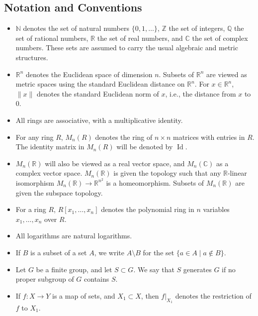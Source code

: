 \documentclass[11pt, a4paper]{article}
\begin{document}
\subsection*{Notation and Conventions}
\begin{itemize}
  \item $\mathbb{N}$ denotes the set of natural numbers $\{0, 1, \dots\}$, $\mathbb{Z}$ the set of integers, $\mathbb{Q}$ the set of rational numbers, $\mathbb{R}$ the set of real numbers, and $\mathbb{C}$ the set of complex numbers. These sets are assumed to carry the usual algebraic and metric structures.
  \item $\mathbb{R}^n$ denotes the Euclidean space of dimension $n$. Subsets of $\mathbb{R}^n$ are viewed as metric spaces using the standard Euclidean distance on $\mathbb{R}^n$. For $x \in \mathbb{R}^n$, $\|x\|$ denotes the standard Euclidean norm of $x$, i.e., the distance from $x$ to $0$.
  \item All rings are associative, with a multiplicative identity.
  \item For any ring $R$, $M_n(R)$ denotes the ring of $n \times n$ matrices with entries in $R$. The identity matrix in $M_n(R)$ will be denoted by $\operatorname{Id}$.
  \item $M_n(\mathbb{R})$ will also be viewed as a real vector space, and $M_n(\mathbb{C})$ as a complex vector space. $M_n(\mathbb{R})$ is given the topology such that any $\mathbb{R}$-linear isomorphism $M_n(\mathbb{R}) \to \mathbb{R}^{n^2}$ is a homeomorphism. Subsets of $M_n(\mathbb{R})$ are given the subspace topology.
  \item For a ring $R$, $R[x_1, \dots, x_n]$ denotes the polynomial ring in $n$ variables $x_1, \dots, x_n$ over $R$.
  \item All logarithms are natural logarithms.
  \item If $B$ is a subset of a set $A$, we write $A \setminus B$ for the set $\{a \in A \mid a \notin B\}$.
  \item Let $G$ be a finite group, and let $S \subset G$. We say that $S$ generates $G$ if no proper subgroup of $G$ contains $S$.
  \item If $f: X \to Y$ is a map of sets, and $X_1 \subset X$, then $f|_{X_1}$ denotes the restriction of $f$ to $X_1$.
\end{itemize}
\end{document}
